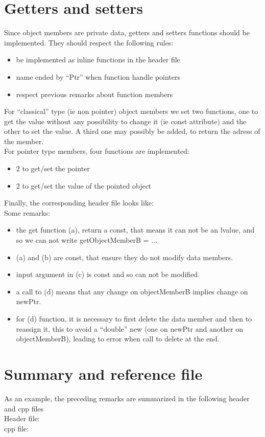 \section{Getters and setters}
Since object members are private data, getters and setters functions should be implemented. 
They should respect the following rules:
\begin{itemize}
\item be implemented as inline functions in the header file
\item name ended by ``Ptr'' when function handle pointers
\item respect previous remarks about function members 
\end{itemize}
For ``classical'' type (ie non pointer) object members we set two functions, one to get the value without any possibility
 to change it (ie const attribute) and the other to set the value. A third one may possibly be added, to return the adress of the member. \\
For pointer type members, four functions are implemented: 
\begin{itemize}
\item 2 to get/set the pointer
\item 2 to get/set the value of the pointed object
\end{itemize}
Finally, the corresponding header file looks like: \\

Some remarks: 
\begin{itemize}
\item the get function (a), return a const, that means it can not be an lvalue, and so we can not write
getObjectMemberB = ...
\item (a) and (b) are const, that ensure they do not modify data members.
\item input argument in (c) is const and so can not be modified. 
\item a call to (d) means that any change on objectMemberB implies change on newPtr. 
\item for (d) function, it is necessary to first delete the data member and then to reassign it, this to avoid a ``double'' new (one on newPtr and another on objectMemberB), leading to error when call to delete at the end. 
\end{itemize}


\section{Summary and reference file}
As an example, the preceding remarks are summarized in the following header and cpp files\\
Header file: \\

cpp file: \\



